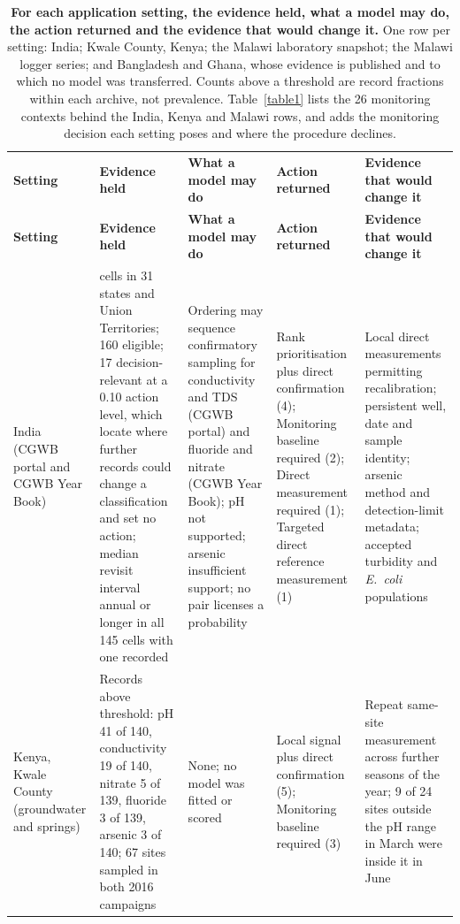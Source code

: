 \documentclass[10pt,letterpaper]{article}
\newlength\savedwidth
\newcommand\thickhline{\noalign{\global\savedwidth\arrayrulewidth\global\arrayrulewidth 2pt}%
\hline
\noalign{\global\arrayrulewidth\savedwidth}}
\begin{document}
\nolinenumbers
{\footnotesize\setlength{\tabcolsep}{3pt}\setlength{\LTcapwidth}{\linewidth}\captionsetup{font=normalsize}
\begin{longtable}{>{\raggedright\arraybackslash}p{0.86in}>{\raggedright\arraybackslash}p{1.64in}>{\raggedright\arraybackslash}p{1.17in}>{\raggedright\arraybackslash}p{1.17in}>{\raggedright\arraybackslash}p{1.25in}}
\caption{\textbf{For each application setting, the evidence held, what a model may do, the action returned and the evidence that would change it.} One row per setting: India; Kwale County, Kenya; the Malawi laboratory snapshot; the Malawi logger series; and Bangladesh and Ghana, whose evidence is published and to which no model was transferred. Counts above a threshold are record fractions within each archive, not prevalence. Table~\ref{table1} lists the 26 monitoring contexts behind the India, Kenya and Malawi rows, and  adds the monitoring decision each setting poses and where the procedure declines.}\label{table4} \\
\hline
\textbf{Setting} & \textbf{Evidence held} & \textbf{What a model may do} & \textbf{Action returned} & \textbf{Evidence that would change it} \\ \thickhline
\endfirsthead
\hline
\textbf{Setting} & \textbf{Evidence held} & \textbf{What a model may do} & \textbf{Action returned} & \textbf{Evidence that would change it} \\ \thickhline
\endhead
India (CGWB portal and CGWB Year Book) & 186 cells in 31 states and Union Territories; 160 eligible; 17 decision-relevant at a 0.10 action level, which locate where further records could change a classification and set no action; median revisit interval annual or longer in all 145 cells with one recorded & Ordering may sequence confirmatory sampling for conductivity and TDS (CGWB portal) and fluoride and nitrate (CGWB Year Book); pH not supported; arsenic insufficient support; no pair licenses a probability & Rank prioritisation plus direct confirmation (4); Monitoring baseline required (2); Direct measurement required (1); Targeted direct reference measurement (1) & Local direct measurements permitting recalibration; persistent well, date and sample identity; arsenic method and detection-limit metadata; accepted turbidity and \textit{E.~coli} populations \\ \hline
Kenya, Kwale County (groundwater and springs) & Records above threshold: pH 41 of 140, conductivity 19 of 140, nitrate 5 of 139, fluoride 3 of 139, arsenic 3 of 140; 67 sites sampled in both 2016 campaigns & None; no model was fitted or scored & Local signal plus direct confirmation (5); Monitoring baseline required (3) & Repeat same-site measurement across further seasons of the year; 9 of 24 sites outside the pH range in March were inside it in June \\ \hline

\end{longtable}}
\end{document}
